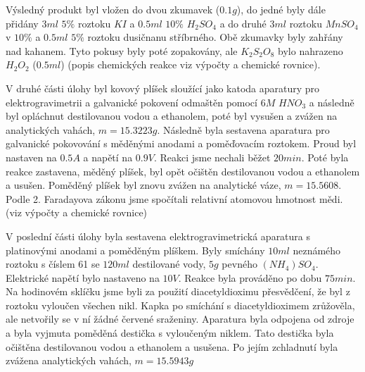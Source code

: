 \documentclass[13pt, a4paper, twoside]{article}
\begin{document}
Výsledný produkt byl vložen do dvou zkumavek ($0.1g$), do jedné byly dále přidány
$3ml$ $5\%$ roztoku $KI$ a $0.5ml$ $10\%$ $H_2SO_4$ a do druhé $3ml$ roztoku $MnSO_4$ v $10\%$
a $0.5ml$ $5\%$ roztoku dusičnanu stříbrného. Obě zkumavky byly zahřány nad kahanem. Tyto pokusy byly poté zopakovány, ale
$K_2S_2O_8$ bylo nahrazeno $H_2O_2$ ($0.5ml$) (popis chemických reakce viz výpočty a chemické rovnice).

V druhé části úlohy byl kovový plíšek sloužící jako katoda aparatury pro elektrogravimetrii a galvanické pokovení odmaštěn pomocí
$6M$ $HNO_3$ a následně byl opláchnut destilovanou vodou a ethanolem, poté byl vysušen a zvážen na analytických vahách,
$m=15.3223g$. Následně byla sestavena aparatura pro galvanické pokovování s měděnými anodami a poměďovacím roztokem.
Proud byl nastaven na $0.5 A$ a napětí na $0.9V$. Reakci jsme nechali běžet $20min$.
Poté byla reakce zastavena, měděný plíšek, byl opět očištěn destilovanou vodou a ethanolem a usušen. Poměděný plíšek byl znovu zvážen na analytické váze,
$m=15.5608$. Podle 2. Faradayova zákonu jsme spočítali relativní atomovou hmotnost mědi. (viz výpočty a chemické rovnice)


V poslední části úlohy byla sestavena elektrogravimetrická aparatura s platinovými anodami a poměděným plíškem. Byly smíchány $10ml$
neznámého roztoku s číslem 61 se $120ml$ destilované vody, $5g$ pevného
$(NH_4)SO_4$. Elektrické napětí bylo nastaveno na $10V$. Reakce byla prováděno po dobu 
$75min$. Na hodinovém sklíčku jsme byli za použití diacetyldioximu přesvědčení, že byl z roztoku vyloučen všechen nikl. Kapka po smíchání s diacetyldioximem zrůžověla, ale netvořily se v ní žádné červené sraženiny. Aparatura byla odpojena od zdroje a byla vyjmuta poměděná destička s vyloučeným niklem. Tato destička byla očištěna destilovanou vodou a ethanolem a usušena. Po jejím zchladnutí byla zvážena analytických vahách,
$m=15.5943g$
\end{document}
